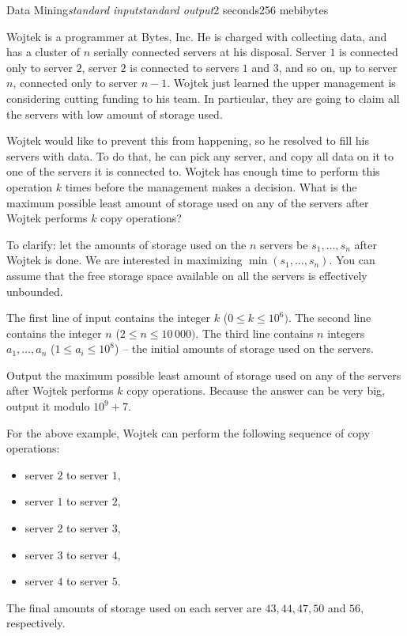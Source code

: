 \begin{problem}{Data Mining}{\textsl{standard input}}{\textsl{standard output}}{2 seconds}{256 mebibytes}{}

    Wojtek is a programmer at Bytes, Inc.
    He is charged with collecting data, and has a cluster of $n$ serially connected servers at his disposal.
    Server $1$ is connected only to server $2$, server $2$ is connected to servers $1$ and $3$, and so on, up to server $n$, connected only to server $n - 1$.
    Wojtek just learned the upper management is considering cutting funding to his team.
    In particular, they are going to claim all the servers with low amount of storage used.

    Wojtek would like to prevent this from happening, so he resolved to fill his servers with data.
    To do that, he can pick any server, and copy all data on it to one of the servers it is connected to.
    Wojtek has enough time to perform this operation $k$ times before the management makes a decision.
    What is the maximum possible least amount of storage used on any of the servers after Wojtek performs $k$ copy operations?

    To clarify: let the amounts of storage used on the $n$ servers be $s_1, \ldots, s_n$ after Wojtek is done.
    We are interested in maximizing $\min(s_1, \ldots, s_n)$.
    You can assume that the free storage space available on all the servers is effectively unbounded.


\InputFile
  The first line of input contains the integer $k$ ($0 \leq k \leq 10^6)$.
  The second line contains the integer $n$ ($2 \leq n \leq 10\,000)$.
  The third line contains $n$ integers $a_1, \ldots, a_n$ ($1 \leq a_i \leq 10^8$) -- the initial amounts of storage used on the servers.

\OutputFile

Output the maximum possible least amount of storage used on any of the servers 
after Wojtek performs $k$ copy operations. Because the answer can be very big, 
output it modulo $10^9 + 7$.

\Examples
\begin{example}
%
\end{example}

\Note

    For the above example, Wojtek can perform the following sequence of copy operations:
    \begin{itemize}
        \item server $2$ to server $1$,
        \item server $1$ to server $2$,
        \item server $2$ to server $3$,
        \item server $3$ to server $4$,
        \item server $4$ to server $5$.
    \end{itemize}
    The final amounts of storage used on each server are $43, 44, 47, 50$ and $56$, respectively.


\end{problem}
